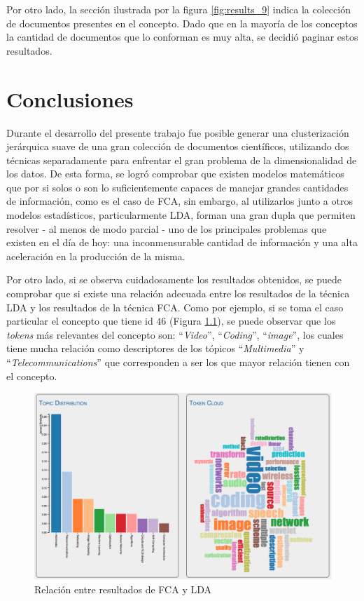 \documentclass[12pt,oneside,letterpaper]{book}
\newcommand{\eng}[1]{\textit{#1}\xspace}			%
\newcommand{\abr}[1]{\textsc{#1}\xspace}           %
\theoremstyle{definition}
\begin{document}
Por otro lado, la sección ilustrada por la figura \ref{fig:results_9} indica la colección de documentos presentes en el concepto. Dado que en la mayoría de los conceptos la cantidad de documentos que lo conforman es muy alta, se decidió paginar estos resultados.

\chapter{Conclusiones}
\label{chap:conclutions}
Durante el desarrollo del presente trabajo fue posible generar una clusterización jerárquica suave de una gran colección de documentos científicos, utilizando dos técnicas separadamente para enfrentar el gran problema de la dimensionalidad de los datos. De esta forma, se logró comprobar que existen modelos matemáticos que por si solos o son lo suficientemente capaces de manejar grandes cantidades de información, como es el caso de \abr{FCA}, sin embargo, al utilizarlos junto a otros modelos estadísticos, particularmente \abr{LDA}, forman una gran dupla que permiten resolver - al menos de modo parcial - uno de los principales problemas que existen en el día de hoy: una inconmensurable cantidad de información y una alta aceleración en la producción de la misma.

Por otro lado, si se observa cuidadosamente los resultados obtenidos, se puede comprobar que si existe una relación adecuada entre los resultados de la técnica \abr{LDA} y los resultados de la técnica \abr{FCA}. Como por ejemplo, si se toma el caso particular el concepto que tiene id $46$ (Figura \ref{fig:conclusiones_1}), se puede observar que los \eng{tokens} más relevantes del concepto son: ``\eng{Video}'', ``\eng{Coding}'', ``\eng{image}'', los cuales tiene mucha relación como descriptores de los tópicos ``\eng{Multimedia}'' y ``\eng{Telecommunications}'' que corresponden a ser los que mayor relación tienen con el concepto.

 \begin{figure}[h!]
	\centering
	\includegraphics[width=1\textwidth]{images/conclusiones_1.png}
	\caption{Relación entre resultados de \abr{FCA} y \abr{LDA}}
	\label{fig:conclusiones_1}
\end{figure}
\end{document}
